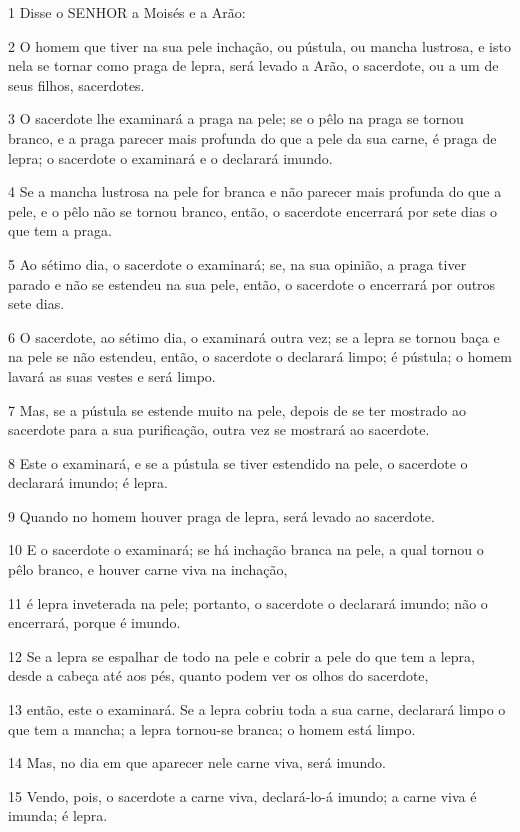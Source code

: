 \par 1 Disse o SENHOR a Moisés e a Arão:
\par 2 O homem que tiver na sua pele inchação, ou pústula, ou mancha lustrosa, e isto nela se tornar como praga de lepra, será levado a Arão, o sacerdote, ou a um de seus filhos, sacerdotes.
\par 3 O sacerdote lhe examinará a praga na pele; se o pêlo na praga se tornou branco, e a praga parecer mais profunda do que a pele da sua carne, é praga de lepra; o sacerdote o examinará e o declarará imundo.
\par 4 Se a mancha lustrosa na pele for branca e não parecer mais profunda do que a pele, e o pêlo não se tornou branco, então, o sacerdote encerrará por sete dias o que tem a praga.
\par 5 Ao sétimo dia, o sacerdote o examinará; se, na sua opinião, a praga tiver parado e não se estendeu na sua pele, então, o sacerdote o encerrará por outros sete dias.
\par 6 O sacerdote, ao sétimo dia, o examinará outra vez; se a lepra se tornou baça e na pele se não estendeu, então, o sacerdote o declarará limpo; é pústula; o homem lavará as suas vestes e será limpo.
\par 7 Mas, se a pústula se estende muito na pele, depois de se ter mostrado ao sacerdote para a sua purificação, outra vez se mostrará ao sacerdote.
\par 8 Este o examinará, e se a pústula se tiver estendido na pele, o sacerdote o declarará imundo; é lepra.
\par 9 Quando no homem houver praga de lepra, será levado ao sacerdote.
\par 10 E o sacerdote o examinará; se há inchação branca na pele, a qual tornou o pêlo branco, e houver carne viva na inchação,
\par 11 é lepra inveterada na pele; portanto, o sacerdote o declarará imundo; não o encerrará, porque é imundo.
\par 12 Se a lepra se espalhar de todo na pele e cobrir a pele do que tem a lepra, desde a cabeça até aos pés, quanto podem ver os olhos do sacerdote,
\par 13 então, este o examinará. Se a lepra cobriu toda a sua carne, declarará limpo o que tem a mancha; a lepra tornou-se branca; o homem está limpo.
\par 14 Mas, no dia em que aparecer nele carne viva, será imundo.
\par 15 Vendo, pois, o sacerdote a carne viva, declará-lo-á imundo; a carne viva é imunda; é lepra.
